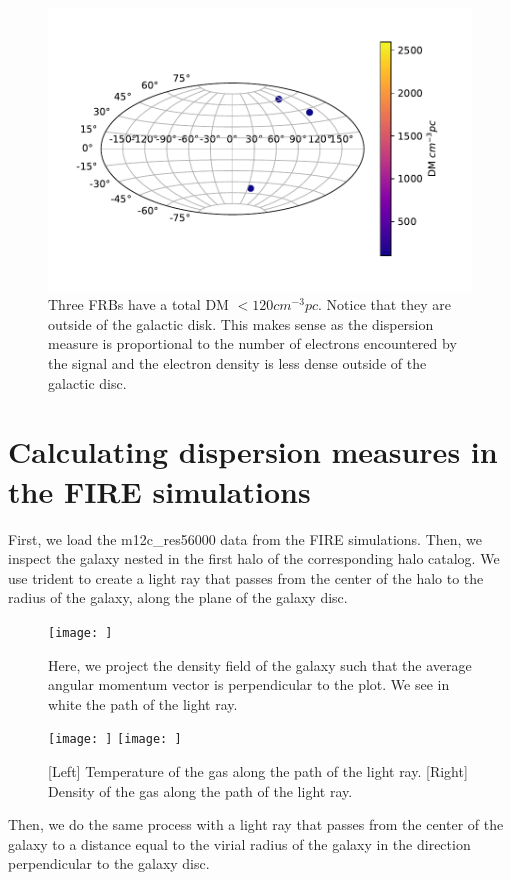 \documentclass{article}
\begin{document}
\begin{figure}[h]
\begin{center}
  \includegraphics[width = 0.4\columnwidth]{FRB_gal_low_DM.pdf}
\caption{Three FRBs have a total DM $<120 cm^{-3}pc$. Notice that they are outside of the galactic disk. This makes sense as the dispersion measure is proportional to the number of electrons encountered by the signal and the electron density is less dense outside of the galactic disc.}
\end{center}
\end{figure}

\section{Calculating dispersion measures in the FIRE simulations}
First, we load the m12c\_res56000 data from the FIRE simulations. Then, we inspect the galaxy nested in the first halo of the corresponding halo catalog. We use trident to create a light ray that passes from the center of the halo to the radius of the galaxy, along the plane of the galaxy disc.

\begin{figure}[h]
\begin{center}
  \texttt{[image: ]}
\caption{Here, we project the density field of the galaxy such that the average angular momentum vector is perpendicular to the plot. We see in white the path of the light ray.}
\label{galaxydisc}
\end{center}
\end{figure}

\begin{figure}[h]
\begin{center}
\texttt{[image: ]}
\texttt{[image: ]}
\caption{[Left] Temperature of the gas along the path of the light ray. [Right] Density of the gas along the path of the light ray.}
\label{denstempdisc}
\end{center}
\end{figure}

Then, we do the same process with a light ray that passes from the center of the galaxy to a distance equal to the virial radius of the galaxy in the direction perpendicular to the galaxy disc.
\end{document}
